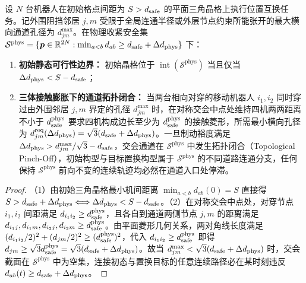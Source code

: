 \begin{theorem}[二阶底盘物理安全裕度内缩下的密集通道闭合临界条件]\label{thm:passability-tradeoff}
设 $N$ 台机器人在初始格点间距为 $S>d_{\mathrm{safe}}$ 的平面三角晶格上执行位置互换任务。记外围阻挡邻居 $j,m$ 受限于全局连通半径或外层节点约束所能张开的最大横向通道孔径为 $d_{jm}^{\max}$。在物理收紧安全集 $\mathcal S^{\mathrm{phys}}=\{\boldsymbol{p}\in\mathbb R^{2N}:\min_{a<b}d_{ab}\ge d_{\mathrm{safe}}+\Delta d_{\mathrm{phys}}\}$ 下：
\begin{enumerate}
 \item \textbf{初始静态可行性边界：} 初始晶格位于 $\operatorname{int}(\mathcal S^{\mathrm{phys}})$ 当且仅当 $\Delta d_{\mathrm{phys}}<S-d_{\mathrm{safe}}$；
 \item \textbf{三体接触膨胀下的通道拓扑闭合：} 当两台相向对穿的移动机器人 $i_1,i_2$ 同时穿过由外围邻居 $j,m$ 界定的孔径 $d_{jm}^{\max}$ 时，在对称交会中点处维持四机两两距离不小于 $d_{\mathrm{safe}}^{\mathrm{phys}}$ 要求四机构成边长至少为 $d_{\mathrm{safe}}^{\mathrm{phys}}$ 的接触菱形，所需最小横向孔径为 $d_{jm}^{\mathrm{req}}(\Delta d_{\mathrm{phys}})=\sqrt{3}(d_{\mathrm{safe}}+\Delta d_{\mathrm{phys}})$。一旦制动裕度满足 $\Delta d_{\mathrm{phys}}>d_{jm}^{\max}/\sqrt{3}-d_{\mathrm{safe}}$，交会通道在 $\mathcal S^{\mathrm{phys}}$ 中发生拓扑闭合（Topological Pinch-Off），初始构型与目标置换构型属于 $\mathcal S^{\mathrm{phys}}$ 的不同道路连通分支，任何保持 $\mathcal S^{\mathrm{phys}}$ 前向不变的连续轨迹均必然在通道入口处停滞。
\end{enumerate}
\end{theorem}
\begin{proof}
（1）由初始三角晶格最小机间距离 $\min_{a<b}d_{ab}(0)=S$ 直接得 $S>d_{\mathrm{safe}}+\Delta d_{\mathrm{phys}}\Longleftrightarrow\Delta d_{\mathrm{phys}}<S-d_{\mathrm{safe}}$。（2）在对称交会中点处，对穿节点 $i_1,i_2$ 间距满足 $d_{i_1 i_2}\ge d_{\mathrm{safe}}^{\mathrm{phys}}$，且各自到通道两侧节点 $j,m$ 的距离满足 $d_{i_1 j},d_{i_1 m},d_{i_2 j},d_{i_2 m}\ge d_{\mathrm{safe}}^{\mathrm{phys}}$。由平面菱形几何关系，两对角线长度满足 $(d_{i_1 i_2}/2)^2+(d_{jm}/2)^2\ge(d_{\mathrm{safe}}^{\mathrm{phys}})^2$，代入 $d_{i_1 i_2}\ge d_{\mathrm{safe}}^{\mathrm{phys}}$ 即得 $d_{jm}\ge\sqrt{3}d_{\mathrm{safe}}^{\mathrm{phys}}=\sqrt{3}(d_{\mathrm{safe}}+\Delta d_{\mathrm{phys}})$。故当 $d_{jm}^{\max}<\sqrt{3}(d_{\mathrm{safe}}+\Delta d_{\mathrm{phys}})$ 时，交会截面在 $\mathcal S^{\mathrm{phys}}$ 中为空集，连接初态与置换目标的任意连续路径必在某时刻违反 $d_{ab}(t)\ge d_{\mathrm{safe}}+\Delta d_{\mathrm{phys}}$。
\end{proof}

